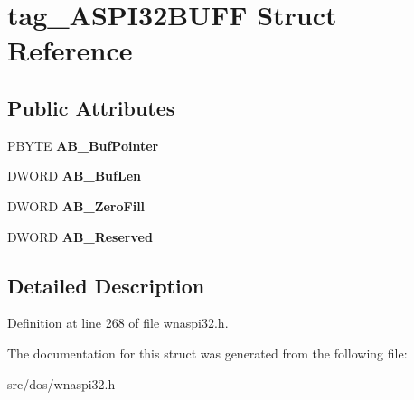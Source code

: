 \hypertarget{structtag__ASPI32BUFF}{\section{tag\-\_\-\-A\-S\-P\-I32\-B\-U\-F\-F Struct Reference}
\label{structtag__ASPI32BUFF}
}
\subsection*{Public Attributes}
\begin{DoxyCompactItemize}
\item 
\hypertarget{structtag__ASPI32BUFF_a3aee8cca054eb6172c5bbe2b923b0acc}{P\-B\-Y\-T\-E {\bfseries A\-B\-\_\-\-Buf\-Pointer}}\label{structtag__ASPI32BUFF_a3aee8cca054eb6172c5bbe2b923b0acc}

\item 
\hypertarget{structtag__ASPI32BUFF_a0f013043506ff69c5929e924861401b6}{D\-W\-O\-R\-D {\bfseries A\-B\-\_\-\-Buf\-Len}}\label{structtag__ASPI32BUFF_a0f013043506ff69c5929e924861401b6}

\item 
\hypertarget{structtag__ASPI32BUFF_aea6d98b201512f6e62edd11064e4bc65}{D\-W\-O\-R\-D {\bfseries A\-B\-\_\-\-Zero\-Fill}}\label{structtag__ASPI32BUFF_aea6d98b201512f6e62edd11064e4bc65}

\item 
\hypertarget{structtag__ASPI32BUFF_a139b9bbbd606f99bbf4c19ce09df07b9}{D\-W\-O\-R\-D {\bfseries A\-B\-\_\-\-Reserved}}\label{structtag__ASPI32BUFF_a139b9bbbd606f99bbf4c19ce09df07b9}

\end{DoxyCompactItemize}


\subsection{Detailed Description}


Definition at line 268 of file wnaspi32.\-h.



The documentation for this struct was generated from the following file\-:\begin{DoxyCompactItemize}
\item 
src/dos/wnaspi32.\-h\end{DoxyCompactItemize}
